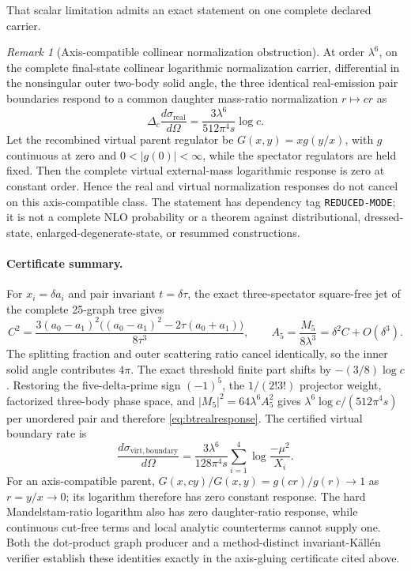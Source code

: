 \documentclass[11pt]{article}
\theoremstyle{definition}
\theoremstyle{remark}
\newtheorem{remark}[theorem]{Remark}
\begin{document}
That scalar limitation admits an exact statement on one complete declared
carrier.

\begin{remark}[Axis-compatible collinear normalization obstruction]
\label{rem:btaxis}
At order $\lambda^6$, on the complete final-state collinear logarithmic
normalization carrier, differential in the nonsingular outer two-body solid
angle, the three identical real-emission pair boundaries respond to a common
daughter mass-ratio normalization $r\mapsto cr$ as
\begin{equation}\label{eq:btrealresponse}
 \Delta_c\frac{d\sigma_{\mathrm{real}}}{d\Omega}
 =\frac{3\lambda^6}{512\pi^4s}\log c.
\end{equation}
Let the recombined virtual parent regulator be
$G(x,y)=xg(y/x)$, with $g$ continuous at zero and
$0<|g(0)|<\infty$, while the spectator regulators are held fixed.  Then the
complete virtual external-mass logarithmic response is zero at constant
order.  Hence the real and virtual normalization responses do not cancel on
this axis-compatible class.  The statement has dependency tag
\texttt{REDUCED-MODE}; it is not a complete NLO probability or a theorem
against distributional, dressed-state, enlarged-degenerate-state, or
resummed constructions.
\end{remark}

\paragraph{Certificate summary.}
For $x_i=\delta a_i$ and pair invariant $t=\delta\tau$, the exact
three-spectator square-free jet of the complete 25-graph tree gives
\begin{equation}
 [a_2a_3a_4]C^2=
 \frac{3(a_0-a_1)^2
 \bigl((a_0-a_1)^2-2\tau(a_0+a_1)\bigr)}{8\tau^3},
 \qquad A_5=\frac{M_5}{8\lambda^3}=\delta^2C+O(\delta^3).
\end{equation}
The splitting fraction and outer scattering ratio cancel identically, so the
inner solid angle contributes $4\pi$.  The exact threshold finite part shifts
by $-(3/8)\log c$.  Restoring the five-delta-prime sign $(-1)^5$, the
$1/(2!3!)$ projector weight, factorized three-body phase space, and
$|M_5|^2=64\lambda^6A_5^2$ gives
$\lambda^6\log c/(512\pi^4s)$ per unordered pair and therefore
\eqref{eq:btrealresponse}.  The certified virtual boundary rate is
\begin{equation}
 \frac{d\sigma_{\mathrm{virt,boundary}}}{d\Omega}
 =\frac{3\lambda^6}{128\pi^4s}
 \sum_{i=1}^{4}\log\frac{-\mu^2}{X_i}.
\end{equation}
For an axis-compatible parent,
$G(x,cy)/G(x,y)=g(cr)/g(r)\to1$ as $r=y/x\to0$; its logarithm therefore
has zero constant response.  The hard Mandelstam-ratio logarithm also has
zero daughter-ratio response, while continuous cut-free terms and local
analytic counterterms cannot supply one.  Both the dot-product graph producer
and a method-distinct invariant-K\"all\'en verifier establish these identities
exactly in the axis-gluing certificate cited above.
\end{document}
